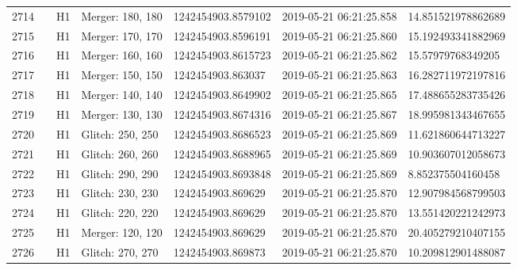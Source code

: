 \begin{longtable}{lllllll}
2714 &                                                    &       H1 &  Merger: 180, 180 &  1242454903.8579102 &  2019-05-21 06:21:25.858 &  14.851521978862689 \\
2715 &                                                    &       H1 &  Merger: 170, 170 &  1242454903.8596191 &  2019-05-21 06:21:25.860 &  15.192493341882969 \\
2716 &                                                    &       H1 &  Merger: 160, 160 &  1242454903.8615723 &  2019-05-21 06:21:25.862 &   15.57979768349205 \\
2717 &                                                    &       H1 &  Merger: 150, 150 &   1242454903.863037 &  2019-05-21 06:21:25.863 &  16.282711972197816 \\
2718 &                                                    &       H1 &  Merger: 140, 140 &  1242454903.8649902 &  2019-05-21 06:21:25.865 &  17.488655283735426 \\
2719 &                                                    &       H1 &  Merger: 130, 130 &  1242454903.8674316 &  2019-05-21 06:21:25.867 &  18.995981343467655 \\
2720 &                                                    &       H1 &  Glitch: 250, 250 &  1242454903.8686523 &  2019-05-21 06:21:25.869 &  11.621860644713227 \\
2721 &                                                    &       H1 &  Glitch: 260, 260 &  1242454903.8688965 &  2019-05-21 06:21:25.869 &  10.903607012058673 \\
2722 &                                                    &       H1 &  Glitch: 290, 290 &  1242454903.8693848 &  2019-05-21 06:21:25.869 &   8.852375504160458 \\
2723 &                                                    &       H1 &  Glitch: 230, 230 &   1242454903.869629 &  2019-05-21 06:21:25.870 &  12.907984568799503 \\
2724 &                                                    &       H1 &  Glitch: 220, 220 &   1242454903.869629 &  2019-05-21 06:21:25.870 &  13.551420221242973 \\
2725 &                                                    &       H1 &  Merger: 120, 120 &   1242454903.869629 &  2019-05-21 06:21:25.870 &  20.405279210407155 \\
2726 &                                                    &       H1 &  Glitch: 270, 270 &   1242454903.869873 &  2019-05-21 06:21:25.870 &  10.209812901488087 \\

\end{longtable}
